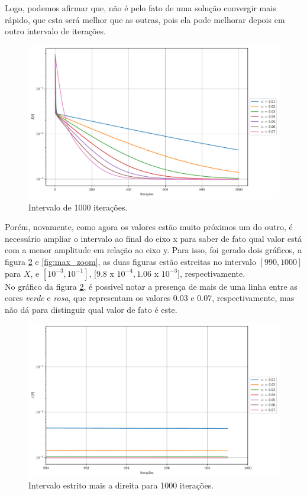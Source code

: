 \documentclass[a4paper, 12pt]{article}
\begin{document}
Logo, podemos afirmar que, não é pelo fato de uma solução convergir mais rápido,
que esta será melhor que as outras, pois ela pode melhorar depois em outro intervalo de iterações.
\begin{figure}[!h]
    \centering
    \includegraphics[width=1\textwidth]{../imgs/lr_1000it.pdf}
    \caption{Intervalo de 1000 iterações.}
    \label{fig:lr_100it}
\end{figure}

Porém, novamente, como agora os valores estão muito próximos um do outro, é necessário ampliar o intervalo
ao final do eixo x para saber de fato qual valor está com a menor amplitude em relação ao eixo y. Para isso, foi gerado dois gráficos,
a figura \ref{fig:higher_interval_1000it} e \ref{fig:max_zoom}, as duas figuras estão estreitas no intervalo $[990,1000]$ para $X$, e 
$[10^{-3},10^{-1}]$, $[9.8$ x $10^{-4},1.06$ x $10^{-3}]$, respectivamente.\\

No gráfico da figura \ref{fig:higher_interval_1000it}, é possivel notar a presença de mais de uma linha entre
as cores \textit{verde} e \textit{rosa}, que representam os valores $0.03$ e $0.07$, respectivamente, mas não
dá para distinguir qual valor de fato é este. 

\begin{figure}[!h]
    \centering
    \includegraphics[width=1\textwidth]{../imgs/higher_interval_1000it.pdf}
    \caption{Intervalo estrito mais a direita para 1000 iterações.}
    \label{fig:higher_interval_1000it}
\end{figure}
\end{document}
